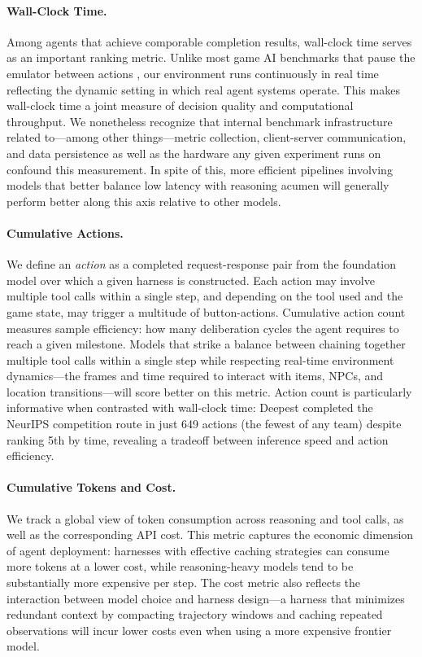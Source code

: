 \paragraph{Wall-Clock Time.} Among agents that achieve comporable completion results, wall-clock time serves as an important ranking metric. Unlike most game AI benchmarks that pause the emulator between actions , our environment runs continuously in real time reflecting the dynamic setting in which real agent systems operate. This makes wall-clock time a joint measure of decision quality and computational throughput. We nonetheless recognize that internal benchmark infrastructure related to---among other things---metric collection, client-server communication, and data persistence as well as the hardware any given experiment runs on confound this measurement. In spite of this, more efficient pipelines involving models that better balance low latency with reasoning acumen will generally perform better along this axis relative to other models.

\paragraph{Cumulative Actions.} We define an \emph{action} as a completed request-response pair from the foundation model over which a given harness is constructed. Each action may involve multiple tool calls within a single step, and depending on the tool used and the game state, may trigger a multitude of button-actions. Cumulative action count measures sample efficiency: how many deliberation cycles the agent requires to reach a given milestone. Models that strike a balance between chaining together multiple tool calls within a single step while respecting real-time environment dynamics---the frames and time required to interact with items, NPCs, and location transitions---will score better on this metric. Action count is particularly informative when contrasted with wall-clock time: Deepest completed the NeurIPS competition route in just 649 actions (the fewest of any team) despite ranking 5th by time, revealing a tradeoff between inference speed and action efficiency. 

\paragraph{Cumulative Tokens and Cost.} We track a global view of token consumption across reasoning and tool calls, as well as the corresponding API cost. This metric captures the economic dimension of agent deployment: harnesses with effective caching strategies can consume more tokens at a lower cost, while reasoning-heavy models tend to be substantially more expensive per step. The cost metric also reflects the interaction between model choice and harness design---a harness that minimizes redundant context by compacting trajectory windows and caching repeated observations will incur lower costs even when using a more expensive frontier model.

